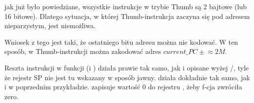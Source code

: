 jak już było powiedziane, wszystkie instrukcje w trybie Thumb są 2 bajtowe (lub 16 bitowe).
Dlatego sytuacja, w której Thumb-instrukcja zaczyna się pod adresem nieparzystym, jest niemożliwa.

Wniosek z tego jest taki, że ostatniego bitu adresu można nie kodować.
W ten sposób, w Thumb-instrukcji  można zakodować adres $current\_PC \pm{}\approx{}2M$.

Reszta instrukcji w funkcji (\PUSH i \POP) działa prawie tak samo, jak i opisane wyżej /, tyle że rejestr \ac{SP} nie jest tu wskazany w sposób jawny.
 działa dokładnie tak samo, jak i w poprzednim przykładzie.
 zapisuje wartość 0 do rejestru , żeby f-cja zwróciła zero.


